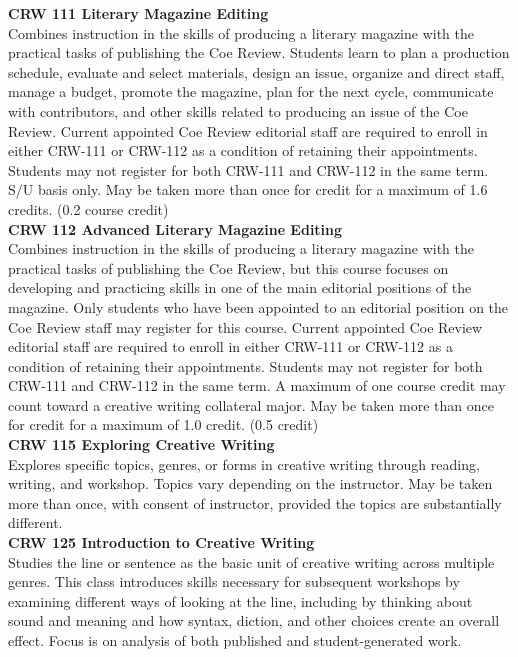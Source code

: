 \documentclass[
  letterpaper,
]{scrbook}
\begin{document}
\textbf{CRW 111 Literary Magazine Editing}\\
Combines instruction in the skills of producing a literary magazine with
the practical tasks of publishing the Coe Review. Students learn to plan
a production schedule, evaluate and select materials, design an issue,
organize and direct staff, manage a budget, promote the magazine, plan
for the next cycle, communicate with contributors, and other skills
related to producing an issue of the Coe Review. Current appointed Coe
Review editorial staff are required to enroll in either CRW-111 or
CRW-112 as a condition of retaining their appointments. Students may not
register for both CRW-111 and CRW-112 in the same term. S/U basis only.
May be taken more than once for credit for a maximum of 1.6 credits.
(0.2 course credit)\\
\textbf{CRW 112 Advanced Literary Magazine Editing}\\
Combines instruction in the skills of producing a literary magazine with
the practical tasks of publishing the Coe Review, but this course
focuses on developing and practicing skills in one of the main editorial
positions of the magazine. Only students who have been appointed to an
editorial position on the Coe Review staff may register for this course.
Current appointed Coe Review editorial staff are required to enroll in
either CRW-111 or CRW-112 as a condition of retaining their
appointments. Students may not register for both CRW-111 and CRW-112 in
the same term. A maximum of one course credit may count toward a
creative writing collateral major. May be taken more than once for
credit for a maximum of 1.0 credit. (0.5 credit)\\
\textbf{CRW 115 Exploring Creative Writing}\\
Explores specific topics, genres, or forms in creative writing through
reading, writing, and workshop. Topics vary depending on the instructor.
May be taken more than once, with consent of instructor, provided the
topics are substantially different.\\
\textbf{CRW 125 Introduction to Creative Writing}\\
Studies the line or sentence as the basic unit of creative writing
across multiple genres. This class introduces skills necessary for
subsequent workshops by examining different ways of looking at the line,
including by thinking about sound and meaning and how syntax, diction,
and other choices create an overall effect. Focus is on analysis of both
published and student-generated work.\\
\end{document}
